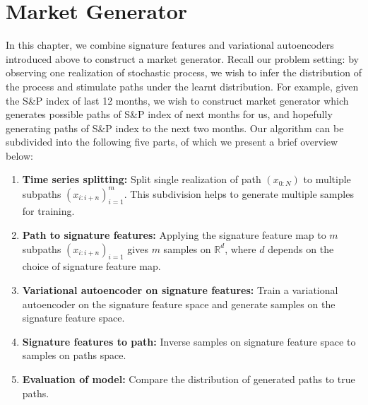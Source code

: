 \documentclass[12pt]{report}
\theoremstyle{definition}
\theoremstyle{remark}
\newcommand{\R}{\mathbb{R}}
\begin{document}
\chapter{Market Generator}\label{marketgenerator}
In this chapter, we combine signature features and variational autoencoders introduced above to construct a market generator. Recall our problem setting: by observing one realization of stochastic process, we wish to infer the distribution of the process and stimulate paths under the learnt distribution. For example, given the S\&P index of last 12 months, we wish to construct market generator which generates possible paths of S\&P index of next months for us, and hopefully generating paths of S\&P index to the next two months. Our algorithm can be subdivided into the following five parts, of which we present a brief overview below:
\begin{enumerate}[start=1,label={( Step \arabic*):}]
  \item \textbf{Time series splitting:} Split single realization of path $(x_{0:N})$ to multiple subpaths $(x_{i:i+n})_{i=1}^{m}$. This subdivision helps to generate multiple samples for training. 
  \item \textbf{Path to signature features:} Applying the signature feature map to $m$ subpaths $(x_{i:i+n})_{i=1}$ gives $m$ samples on $\R^{d}$, where $d$ depends on the choice of signature feature map.   
  \item \textbf{Variational autoencoder on signature features: } Train a variational autoencoder on the signature feature space and generate samples on the signature feature space.  
  \item \textbf{Signature features to path:} Inverse samples on signature feature space to samples on paths space. 
  \item \textbf{Evaluation of model:} Compare the distribution of generated paths to true paths. 
\end{enumerate}
\end{document}
